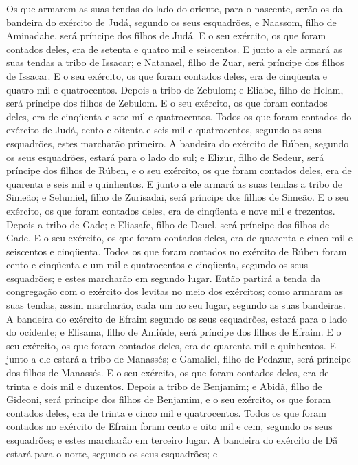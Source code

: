 Os que armarem as suas tendas do lado do oriente, para o nascente,
serão os da bandeira do exército de Judá, segundo os seus
esquadrões, e Naassom, filho de Aminadabe, será príncipe dos filhos
de Judá. E o seu exército, os que foram contados deles, era de
setenta e quatro mil e seiscentos. E junto a ele armará as suas
tendas a tribo de Issacar; e Natanael, filho de Zuar, será príncipe
dos filhos de Issacar. E o seu exército, os que foram contados
deles, era de cinqüenta e quatro mil e quatrocentos. Depois a
tribo de Zebulom; e Eliabe, filho de Helam, será príncipe dos filhos
de Zebulom. E o seu exército, os que foram contados deles, era
de cinqüenta e sete mil e quatrocentos. Todos os que foram
contados do exército de Judá, cento e oitenta e seis mil e
quatrocentos, segundo os seus esquadrões, estes marcharão primeiro.
A bandeira do exército de Rúben, segundo os seus esquadrões,
estará para o lado do sul; e Elizur, filho de Sedeur, será príncipe
dos filhos de Rúben, e o seu exército, os que foram contados
deles, era de quarenta e seis mil e quinhentos. E junto a ele
armará as suas tendas a tribo de Simeão; e Selumiel, filho de
Zurisadai, será príncipe dos filhos de Simeão. E o seu
exército, os que foram contados deles, era de cinqüenta e nove mil e
trezentos. Depois a tribo de Gade; e Eliasafe, filho de
Deuel, será príncipe dos filhos de Gade. E o seu exército, os
que foram contados deles, era de quarenta e cinco mil e seiscentos e
cinqüenta. Todos os que foram contados no exército de Rúben
foram cento e cinqüenta e um mil e quatrocentos e cinqüenta, segundo
os seus esquadrões; e estes marcharão em segundo lugar. Então
partirá a tenda da congregação com o exército dos levitas no meio
dos exércitos; como armaram as suas tendas, assim marcharão, cada um
no seu lugar, segundo as suas bandeiras. A bandeira do
exército de Efraim segundo os seus esquadrões, estará para o lado do
ocidente; e Elisama, filho de Amiúde, será príncipe dos filhos de
Efraim. E o seu exército, os que foram contados deles, era de
quarenta mil e quinhentos. E junto a ele estará a tribo de
Manassés; e Gamaliel, filho de Pedazur, será príncipe dos filhos de
Manassés. E o seu exército, os que foram contados deles, era
de trinta e dois mil e duzentos. Depois a tribo de Benjamim;
e Abidã, filho de Gideoni, será príncipe dos filhos de Benjamim,
e o seu exército, os que foram contados deles, era de trinta
e cinco mil e quatrocentos. Todos os que foram contados no
exército de Efraim foram cento e oito mil e cem, segundo os seus
esquadrões; e estes marcharão em terceiro lugar. A bandeira
do exército de Dã estará para o norte, segundo os seus esquadrões; e
